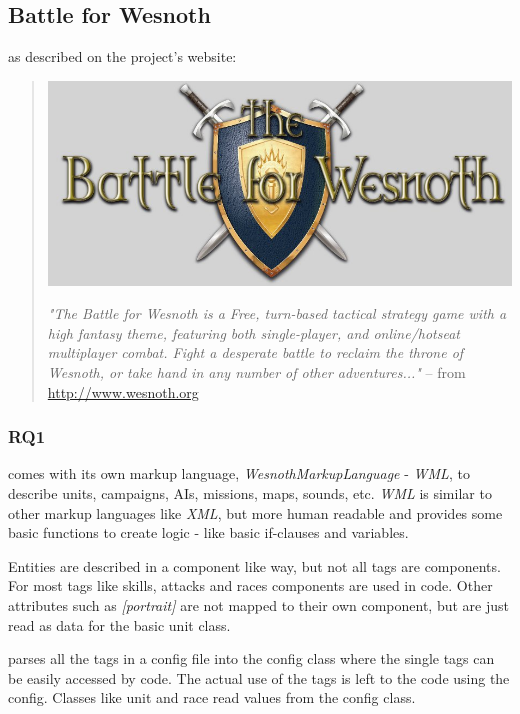 \subsection{Battle for Wesnoth}
\BOW{} as described on the project's website:
\begin{quote}

\begin{center}\includegraphics[scale=0.4]{pics/wesnothlogo}\end{center}

\textit{"The Battle for Wesnoth is a Free, turn-based tactical strategy game with a high fantasy theme, featuring both
single-player, and online/hotseat multiplayer combat. Fight a desperate battle to reclaim the throne of Wesnoth, or take
hand in any number of other adventures..."} -- from \url{http://www.wesnoth.org}
\end{quote}

\subsubsection{RQ1}
\BOW{} comes with its own markup language, \textit{WesnothMarkupLanguage} - \textit{WML}, to describe units, campaigns, AIs,
missions, maps, sounds, etc. \textit{WML} is similar to other markup languages like \textit{XML}, but more human readable and provides some basic functions to create logic - like basic if-clauses and variables. 

Entities are described in a component like way, but not all tags are components. For most tags like skills,
attacks and races components are used in code. Other attributes such as \textit{[portrait]} are not mapped to their own
component, but are just read as data for the basic unit class. 

\BOW{} parses all the tags in a config file into the config class where the single tags can be easily accessed by code.
The actual use of the tags is left to the code using the config. Classes like unit and race read values from the config
class.


